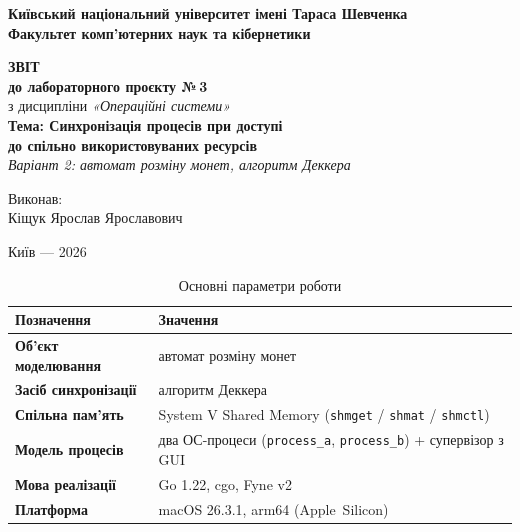 \documentclass[a4paper,12pt]{article}
\newcommand{\dstutablerules}{%
  \setlength{\tabcolsep}{5pt}%
  \renewcommand{\arraystretch}{1.2}%
}
\begin{document}
\begin{titlepage}
    \thispagestyle{empty}
    \begin{center}
        \textbf{Київський національний університет імені Тараса Шевченка}\\
        \textbf{Факультет комп'ютерних наук та кібернетики}
    \end{center}

    \vspace{4cm}

    \begin{center}
        \textbf{\Large ЗВІТ}\\
        \vspace{0.5cm}
        \textbf{\large до лабораторного проєкту №\,3}\\
        \vspace{0.5cm}
        з дисципліни \textit{«Операційні системи»}\\
        \vspace{0.7cm}
        \textbf{Тема: Синхронізація процесів при доступі\\до спільно використовуваних ресурсів}\\
        \vspace{0.4cm}
        \textit{Варіант 2: автомат розміну монет, алгоритм Деккера}
    \end{center}

    \vfill

    \begin{flushright}
        Виконав:\\
        Кіщук Ярослав Ярославович
    \end{flushright}

    \vspace{1.5cm}

    \begin{center}
        Київ --- 2026
    \end{center}
\end{titlepage}

\begin{table}[H]
\caption*{Основні параметри роботи}
\small
\dstutablerules
\begin{tabularx}{\linewidth}{@{}>{\bfseries}l L@{}}
\toprule
Позначення & Значення \\
\midrule
Об'єкт моделювання & автомат розміну монет \\
Засіб синхронізації & алгоритм Деккера \\
Спільна пам'ять & System V Shared Memory (\texttt{shmget} / \texttt{shmat} / \texttt{shmctl}) \\
Модель процесів & два ОС-процеси (\texttt{process\_a}, \texttt{process\_b}) + супервізор з GUI \\
Мова реалізації & Go 1.22, cgo, Fyne v2 \\
Платформа & macOS 26.3.1, arm64 (Apple~Silicon) \\
\bottomrule
\end{tabularx}
\end{table}
\end{document}
